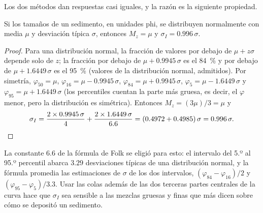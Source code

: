 Los dos métodos dan respuestas casi iguales, y la razón es la siguiente propiedad.

\begin{proposition}\label{prop:b1:clastic-sediments:normal}
Si los tamaños de un sedimento, en unidades phi, se distribuyen normalmente con media
$\mu$ y desviación típica $\sigma$, entonces $M_z = \mu$ y $\sigma_I = 0.996\,\sigma$.
\end{proposition}

\begin{proof}
Para una distribución normal, la fracción de valores por debajo de $\mu + z\sigma$ depende
solo de $z$; la fracción por debajo de $\mu + 0.9945\,\sigma$ es el \qty{84}{\percent}
y por debajo de $\mu + 1.6449\,\sigma$ es el \qty{95}{\percent} (valores de la distribución normal, admitidos). Por simetría, $\varphi_{50} = \mu$, $\varphi_{16} = \mu -
0.9945\,\sigma$, $\varphi_{84} = \mu + 0.9945\,\sigma$, $\varphi_5 = \mu -
1.6449\,\sigma$ y $\varphi_{95} = \mu + 1.6449\,\sigma$ (los percentiles cuentan
la parte más gruesa, es decir, el $\varphi$ menor, pero la distribución es
simétrica). Entonces $M_z = (3\mu)/3 = \mu$ y
\[
  \sigma_I = \frac{2 \times 0.9945\,\sigma}{4} + \frac{2 \times 1.6449\,\sigma}{6.6}
  = (0.4972 + 0.4985)\,\sigma = 0.996\,\sigma. \qedhere
\]
\end{proof}

La constante 6.6 de la fórmula de Folk se eligió para esto: el intervalo del 5.º al 95.º percentil abarca $3.29$ desviaciones típicas de una distribución
normal, y la fórmula promedia las estimaciones de $\sigma$ de los dos intervalos, $(\varphi_{84}-\varphi_{16})/2$ y $(\varphi_{95}-\varphi_5)/3.3$.
Usar las colas además de las dos terceras partes centrales de la curva hace que $\sigma_I$ sea sensible a las mezclas gruesas y finas que más dicen sobre cómo
se depositó un sedimento.

